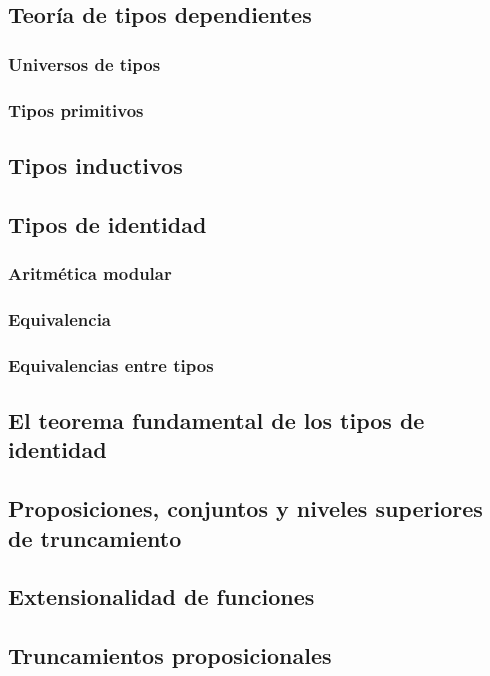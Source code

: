 \documentclass{article}
\begin{document}
\subsection{Teoría de tipos dependientes}
    \subsubsection{Universos de tipos}
    \subsubsection{Tipos primitivos}
    \subsubsection{}

\subsection{Tipos inductivos}

\subsection{Tipos de identidad}

\subsubsection{Aritmética modular}

\subsubsection{Equivalencia}
    \subsubsection{Equivalencias entre tipos}
\subsection{El teorema fundamental de los tipos de identidad}
\subsection{Proposiciones, conjuntos y niveles superiores de truncamiento}
\subsection{Extensionalidad de funciones}
\subsection{Truncamientos proposicionales}
\end{document}
